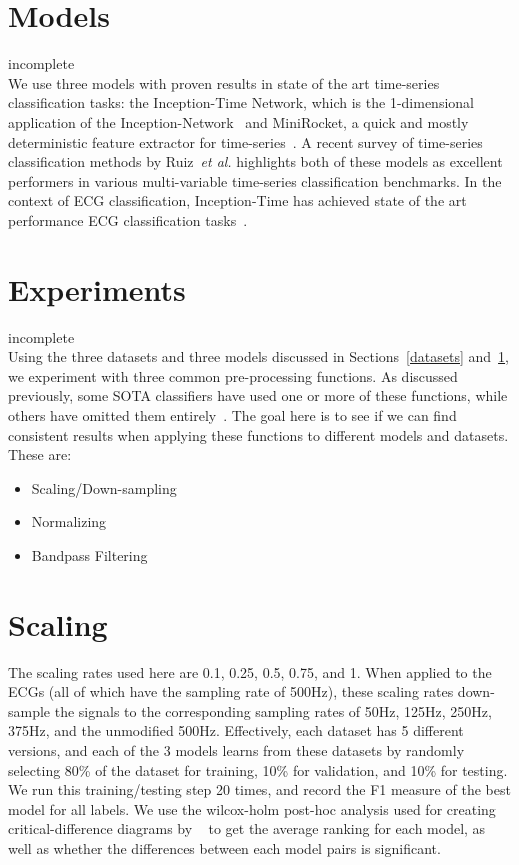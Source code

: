 \documentclass[pmlr,twocolumn]{jmlr}%
\begin{document}
\section{Models}
\label{sec:models}
{\color{red} incomplete}\\
We use three models with proven results in state of the art time-series classification tasks: the Inception-Time Network, which is the 1-dimensional application of the Inception-Network~\cite{szegedy2017inception,ismail2020inceptiontime} and MiniRocket, a quick and mostly deterministic feature extractor for time-series~\cite{dempster2021minirocket}. A recent survey of time-series classification methods by Ruiz~\textit{et al.} highlights both of these models as excellent performers in various multi-variable time-series classification benchmarks. In the context of ECG classification, Inception-Time has achieved state of the art performance ECG classification tasks~\cite{Strodthoff2021}.

\section{Experiments}
\label{sec:experiment}
{\color{red} incomplete}\\
Using the three datasets and three models discussed in Sections~\ref{datasets} and~\ref{sec:models}, we experiment with three common pre-processing functions. As discussed previously, some SOTA classifiers have used one or more of these functions, while others have omitted them entirely~\cite{ribeiro2020automatic}. The goal here is to see if we can find consistent results when applying these functions to different models and datasets. These are:
\begin{itemize}
    \item Scaling/Down-sampling
    \item Normalizing
    \item Bandpass Filtering
\end{itemize}


\section{Scaling}
The scaling rates used here are 0.1, 0.25, 0.5, 0.75, and 1. When applied to the ECGs (all of which have the sampling rate of 500Hz), these scaling rates down-sample the signals to the corresponding sampling rates of 50Hz, 125Hz, 250Hz, 375Hz, and the unmodified 500Hz. Effectively, each dataset has 5 different versions, and each of the 3 models learns from these datasets by randomly selecting 80\% of the dataset for training, 10\% for validation, and 10\% for testing. We run this training/testing step 20 times, and record the F1 measure of the best model for all labels. We use the wilcox-holm post-hoc analysis used for creating critical-difference diagrams by ~\cite{IsmailFawaz2018deep} to get the average ranking for each model, as well as whether the differences between each model pairs is significant. 
\end{document}
